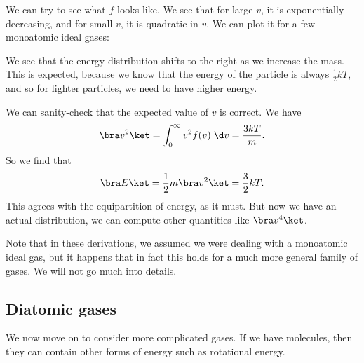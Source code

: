 \documentclass[a4paper]{article}
\begin{document}
We can try to see what $f$ looks like. We see that for large $v$, it is exponentially decreasing, and for small $v$, it is quadratic in $v$. We can plot it for a few monoatomic ideal gases:
\begin{center}
\end{center}
We see that the energy distribution shifts to the right as we increase the mass. This is expected, because we know that the energy of the particle is always $\frac{1}{2}kT$, and so for lighter particles, we need to have higher energy.

We can sanity-check that the expected value of $v$ is correct. We have
\[
  \bra v^2\ket = \int_0^\infty v^2 f(v) \;\d v = \frac{3kT}{m}.
\]
So we find that
\[
  \bra E\ket = \frac{1}{2} m\bra v^2\ket = \frac{3}{2} kT.
\]
This agrees with the equipartition of energy, as it must. But now we have an actual distribution, we can compute other quantities like $\bra v^4\ket$.

Note that in these derivations, we assumed we were dealing with a monoatomic ideal gas, but it happens that in fact this holds for a much more general family of gases. We will not go much into details.

\subsection{Diatomic gases}
We now move on to consider more complicated gases. If we have molecules, then they can contain other forms of energy such as rotational energy.
\end{document}
